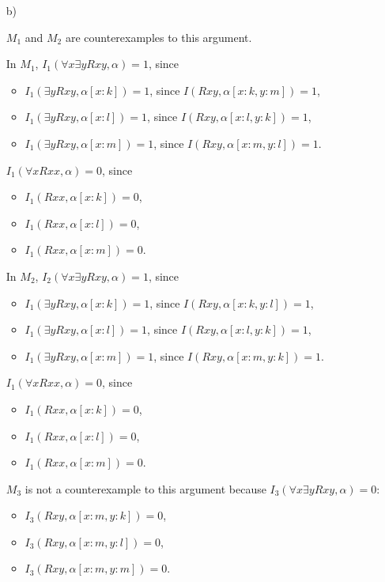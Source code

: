 \begin{enumerate}[label=\alph*)]
\item[b)]

$M_1$ and $M_2$ are counterexamples to this argument.

In $M_1$, $I_1(\forall x \exists y Rxy, \alpha) = 1$, since
\begin{itemize}[topsep=-\parskip, noitemsep, leftmargin=*]
\item $I_1(\exists y Rxy, \alpha[x : k]) = 1$, since $I(Rxy, \alpha[x : k, y : m]) = 1$,
\item $I_1(\exists y Rxy, \alpha[x : l]) = 1$, since $I(Rxy, \alpha[x : l, y : k]) = 1$,
\item $I_1(\exists y Rxy, \alpha[x : m]) = 1$, since $I(Rxy, \alpha[x : m, y : l]) = 1$.
\end{itemize}
$I_1(\forall x Rxx, \alpha) = 0$, since
\vspace{-\parskip}
\begin{itemize}[noitemsep, leftmargin=*]
\item $I_1(Rxx, \alpha[x : k]) = 0$,
\item $I_1(Rxx, \alpha[x : l]) = 0$,
\item $I_1(Rxx, \alpha[x : m]) = 0$.
\end{itemize}

In $M_2$, $I_2(\forall x \exists y Rxy, \alpha) = 1$, since
\begin{itemize}[topsep=-\parskip, noitemsep, leftmargin=*]
\item $I_1(\exists y Rxy, \alpha[x : k]) = 1$, since $I(Rxy, \alpha[x : k, y : l]) = 1$,
\item $I_1(\exists y Rxy, \alpha[x : l]) = 1$, since $I(Rxy, \alpha[x : l, y : k]) = 1$,
\item $I_1(\exists y Rxy, \alpha[x : m]) = 1$, since $I(Rxy, \alpha[x : m, y : k]) = 1$.
\end{itemize}
$I_1(\forall x Rxx, \alpha) = 0$, since
\vspace{-\parskip}
\begin{itemize}[noitemsep, leftmargin=*]
\item $I_1(Rxx, \alpha[x : k]) = 0$,
\item $I_1(Rxx, \alpha[x : l]) = 0$,
\item $I_1(Rxx, \alpha[x : m]) = 0$.
\end{itemize}

$M_3$ is not a counterexample to this argument because $I_3(\forall x \exists y Rxy, \alpha) = 0$:
\vspace{-\parskip}
\begin{itemize}[noitemsep, leftmargin=*]
\item $I_3(Rxy, \alpha[x : m, y : k]) = 0$,
\item $I_3(Rxy, \alpha[x : m, y : l]) = 0$,
\item $I_3(Rxy, \alpha[x : m, y : m]) = 0$.
\end{itemize}

\end{enumerate}